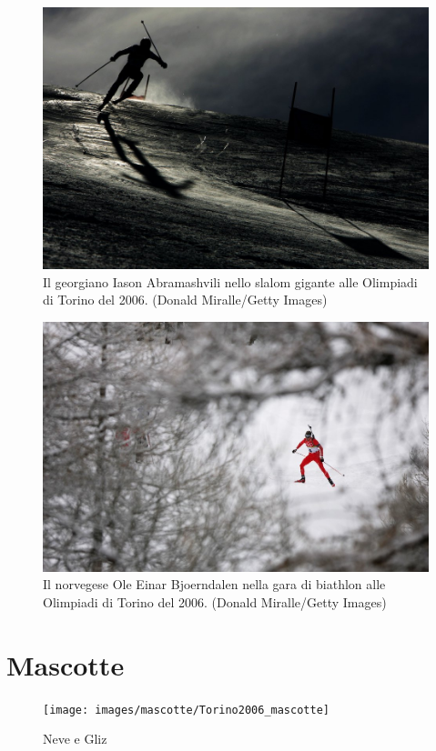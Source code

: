 \documentclass[
]{book}
\begin{document}
\begin{figure}
\includegraphics[width=0.8\linewidth]{images/IlPost/2006} \caption{Il georgiano Iason Abramashvili nello slalom gigante alle Olimpiadi di Torino del 2006. (Donald Miralle/Getty Images)}\label{fig:unnamed-chunk-76}
\end{figure}

\begin{figure}
\includegraphics[width=0.8\linewidth]{images/IlPost/2006(2)} \caption{Il norvegese Ole Einar Bjoerndalen nella gara di biathlon alle Olimpiadi di Torino del 2006. (Donald Miralle/Getty Images)}\label{fig:unnamed-chunk-77}
\end{figure}

\section*{Mascotte}\label{mascotte-9}

\begin{figure}
\texttt{[image: images/mascotte/Torino2006\_mascotte]} \caption{Neve e Gliz}\label{fig:unnamed-chunk-78}
\end{figure}
\end{document}
